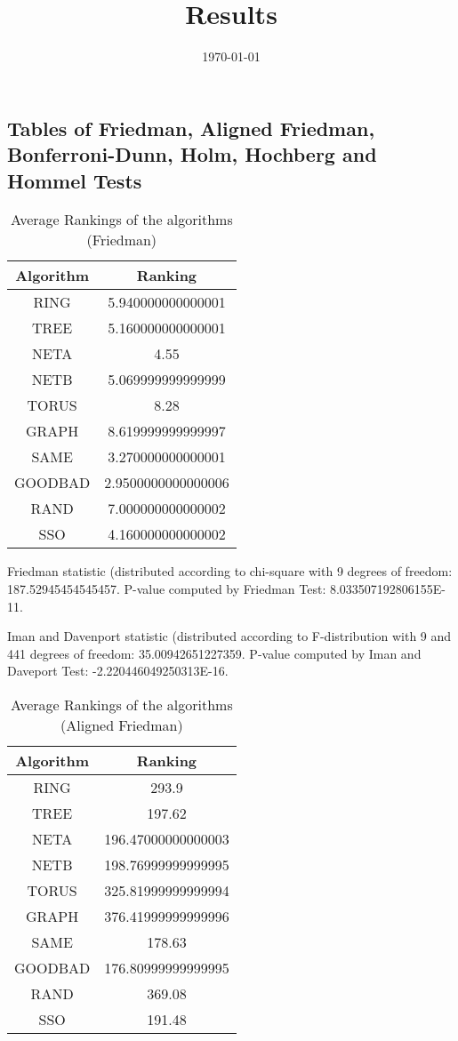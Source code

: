 \documentclass[a4paper,10pt]{article}
\title{Results}
\author{}
\date{\today}
\begin{document}
\begin{landscape}
\oddsidemargin 0in \topmargin 0in\maketitle
\section{Tables of Friedman, Aligned Friedman, Bonferroni-Dunn, Holm, Hochberg and Hommel Tests}
\begin{table}[!htp]
\centering
\caption{Average Rankings of the algorithms (Friedman)
}\begin{tabular}{c|c}
Algorithm&Ranking\\
\hline
 RING&5.940000000000001\\
 TREE&5.160000000000001\\
 NETA&4.55\\
 NETB&5.069999999999999\\
 TORUS&8.28\\
 GRAPH&8.619999999999997\\
 SAME&3.270000000000001\\
 GOODBAD&2.9500000000000006\\
 RAND&7.000000000000002\\
 SSO&4.160000000000002\\
\end{tabular}
\end{table}


Friedman statistic (distributed according to chi-square with 9 degrees of freedom: 187.52945454545457. 
P-value computed by Friedman Test: 8.033507192806155E-11.\newline

Iman and Davenport statistic (distributed according to F-distribution with 9 and 441 degrees of freedom: 35.00942651227359. 
P-value computed by Iman and Daveport Test: -2.220446049250313E-16.\newline


\newpage

\begin{table}[!htp]
\centering
\caption{Average Rankings of the algorithms (Aligned Friedman)
}\begin{tabular}{c|c}
Algorithm&Ranking\\
\hline
 RING&293.9\\
 TREE&197.62\\
 NETA&196.47000000000003\\
 NETB&198.76999999999995\\
 TORUS&325.81999999999994\\
 GRAPH&376.41999999999996\\
 SAME&178.63\\
 GOODBAD&176.80999999999995\\
 RAND&369.08\\
 SSO&191.48\\
\end{tabular}
\end{table}



\end{landscape}
\end{document}
